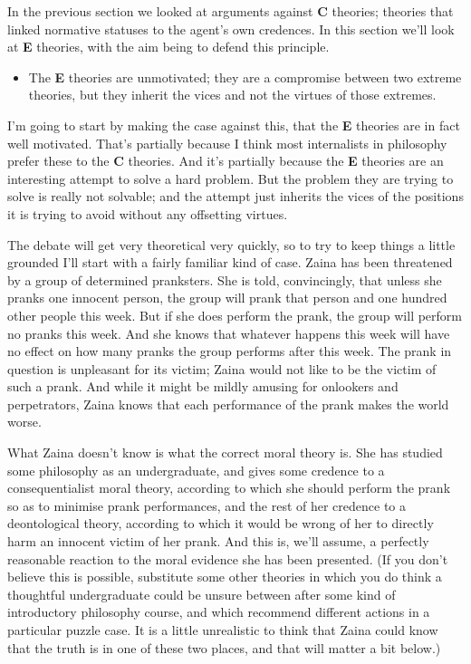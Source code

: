 In the previous section we looked at arguments against \textbf{C} theories; theories that linked normative statuses to the agent's own credences. In this section we'll look at \textbf{E} theories, with the aim being to defend this principle.

\begin{itemize}
\item{} The \textbf{E} theories are unmotivated; they are a compromise between two extreme theories, but they inherit the vices and not the virtues of those extremes.

\end{itemize}
I'm going to start by making the case against this, that the \textbf{E} theories are in fact well motivated. That's partially because I think most internalists in philosophy prefer these to the \textbf{C} theories. And it's partially because the \textbf{E} theories are an interesting attempt to solve a hard problem. But the problem they are trying to solve is really not solvable; and the attempt just inherits the vices of the positions it is trying to avoid without any offsetting virtues.

The debate will get very theoretical very quickly, so to try to keep things a little grounded I'll start with a fairly familiar kind of case. \gls{Zaina} has been threatened by a group of determined pranksters. She is told, convincingly, that unless she pranks one innocent person, the group will prank that person and one hundred other people this week. But if she does perform the prank, the group will perform no pranks this week. And she knows that whatever happens this week will have no effect on how many pranks the group performs after this week. The prank in question is unpleasant for its victim; \gls{Zaina} would not like to be the victim of such a prank. And while it might be mildly amusing for onlookers and perpetrators, \gls{Zaina} knows that each performance of the prank makes the world worse.

What \gls{Zaina} doesn't know is what the correct moral theory is. She has studied some philosophy as an undergraduate, and gives some credence to a consequentialist moral theory, according to which she should perform the prank so as to minimise prank performances, and the rest of her credence to a deontological theory, according to which it would be wrong of her to directly harm an innocent victim of her prank. And this is, we'll assume, a perfectly reasonable reaction to the moral evidence she has been presented. (If you don't believe this is possible, substitute some other theories in which you do think a thoughtful undergraduate could be unsure between after some kind of introductory philosophy course, and which recommend different actions in a particular puzzle case. It is a little unrealistic to think that Zaina could know that the truth is in one of these two places, and that will matter a bit below.)


